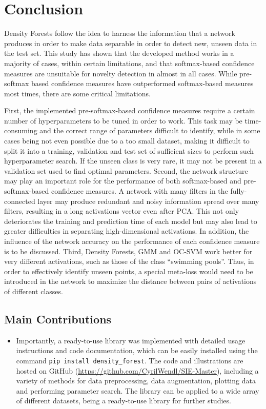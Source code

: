\documentclass[10pt]{article}
\begin{document}
\section{Conclusion}
Density Forests follow the idea to harness the information that a network produces in order to make data separable in order to detect new, unseen data in the test set. This study has shown that the developed method works in a majority of cases, within certain limitations, and that softmax-based confidence measures are unsuitable for novelty detection in almost in all cases. While pre-softmax based confidence measures have outperformed softmax-based measures most times, there are some critical limitations.

First, the implemented pre-softmax-based confidence measures require a certain number of hyperparameters to be tuned in order to work. This task may be time-consuming and the correct range of parameters difficult to identify, while in some cases being not even possible due to a too small dataset, making it difficult to split it into a training, validation and test set of sufficient sizes to perform such hyperparameter search. If the unseen class is very rare, it may not be present in a validation set used to find optimal parameters. Second, the network structure may play an important role for the performance of both softmax-based and pre-softmax-based confidence measures. A network with many filters in the fully-connected layer may produce redundant and noisy information spread over many filters, resulting in a long activations vector even after \gls{PCA}. This not only deteriorates the training and prediction time of each model but may also lead to greater difficulties in separating high-dimensional activations. In addition, the influence of the network accuracy on the performance of each confidence measure is to be discussed. Third, Density Forests, \gls{GMM} and \gls{OC-SVM} work better for very different activations, such as those of the class ``swimming pools''. Thus, in order to effectively identify unseen points, a special meta-loss would need to be introduced in the network to maximize the distance between pairs of activations of different classes.

\subsection{Main Contributions}

\begin{itemize}
	\item Importantly, a ready-to-use library was implemented with detailed usage instructions and code documentation, which can be easily installed using the command \texttt{pip install density\_forest}. The code and illustrations are hosted on GitHub (\url{https://github.com/CyrilWendl/SIE-Master}), including a variety of methods for data preprocessing, data augmentation, plotting data and performing parameter search. The library can be applied to a wide array of different datasets, being a ready-to-use library for further studies.
\end{itemize}
\end{document}

